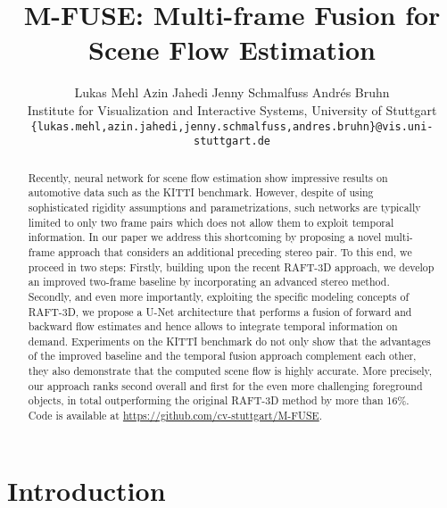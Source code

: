 \documentclass[10pt,twocolumn,letterpaper]{article}
\begin{document}
\title{M-FUSE: Multi-frame Fusion for Scene Flow Estimation}

\author{Lukas Mehl \hspace{15mm} Azin Jahedi \hspace{15mm} Jenny Schmalfuss \hspace{15mm} Andr\'{e}s Bruhn\\
Institute for Visualization and Interactive Systems, University of Stuttgart\\
{\tt\small \{lukas.mehl,azin.jahedi,jenny.schmalfuss,andres.bruhn\}@vis.uni-stuttgart.de}
}

\maketitle


\begin{abstract}
Recently, neural network for scene flow estimation show impressive results on automotive data such as the KITTI benchmark. 
However, despite of using sophisticated rigidity assumptions and parametrizations, such networks are typically limited to only two frame pairs which does not allow them to exploit temporal information.
In our paper we address this shortcoming by proposing a novel multi-frame approach that considers an additional preceding stereo pair.
To this end, we proceed in two steps: 
Firstly, building upon the recent RAFT-3D approach, we develop an improved two-frame baseline by incorporating an advanced stereo method.
Secondly, and even more importantly, exploiting the specific modeling concepts of RAFT-3D, we propose a U-Net architecture that performs a fusion of forward and backward flow estimates and hence allows to integrate temporal information on demand. 
Experiments on the KITTI benchmark do not only show that the advantages of the improved baseline
and the temporal fusion approach complement each other, they also demonstrate that the computed scene flow is highly accurate. 
More precisely, our approach ranks second overall and first for the even more challenging foreground objects, in total outperforming the original RAFT-3D method by more than 16\%.
Code is available at \url{https://github.com/cv-stuttgart/M-FUSE}.\end{abstract}



\section{Introduction}
\end{document}
